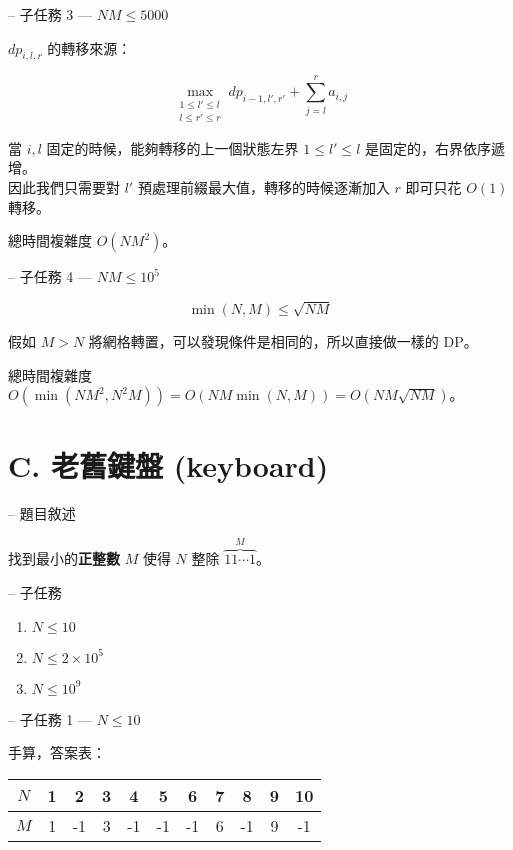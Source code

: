 \documentclass[hyperref,UTF8,notheorems,xcolor={dvipsnames}]{beamer}
\newcommand{\btitle}[1]{{\secname} -- #1}
\theoremstyle{definition}
\begin{document}
\begin{frame}[fragile]{\btitle{子任務 3 --- $NM \leq 5000$}}
	
	$dp_{i, l, r}$ 的轉移來源：
	
	\[ \max_{\substack{1 \leq l' \leq l \\ l \leq r' \leq r}} dp_{i-1, l', r'} + \sum_{j=l}^{r}a_{i,j} \]
	
	當 $i, l$ 固定的時候，能夠轉移的上一個狀態左界 $1 \leq l' \leq l$ 是固定的，右界依序遞增。\\
	因此我們只需要對 $l'$ 預處理前綴最大值，轉移的時候逐漸加入 $r$ 即可只花 $O(1)$ 轉移。

	總時間複雜度 $O(NM^2)$。  

\end{frame}

\begin{frame}[fragile]{\btitle{子任務 4 --- $NM \leq 10^5$}}
	
	\[ \min(N, M) \leq \sqrt{NM} \]

	假如 $M > N$ 將網格轉置，可以發現條件是相同的，所以直接做一樣的 DP。  

	總時間複雜度 $O(\min(NM^2, N^2M)) = O(NM\min(N, M)) = O(NM\sqrt{NM})$。  

\end{frame}

\section{C. 老舊鍵盤 (keyboard)}

\begin{frame}[fragile]{\btitle{題目敘述}}

	找到最小的\textbf{正整數} $M$ 使得 $N$ 整除 $\overset{M}{\overbrace{11\cdots1}}$。
\end{frame}

\begin{frame}[fragile]{\btitle{子任務}}
	\begin{enumerate}
		\item $N \leq 10$
		\item $N \leq 2 \times 10^5$
		\item $N \leq 10^9$
	\end{enumerate}
\end{frame}

\begin{frame}[fragile]{\btitle{子任務 1 --- $N \leq 10$}}
	
	手算，答案表：

	\begin{tabular}{c|c|c|c|c|c|c|c|c|c|c}
	$N$ & 1 & 2 & 3 & 4 & 5 & 6 & 7 & 8 & 9 & 10 \\
	\hline
	$M$ & 1 & -1 & 3 & -1 & -1 & -1 & 6 & -1 & 9 & -1
	\end{tabular}

\end{frame}
\end{document}
